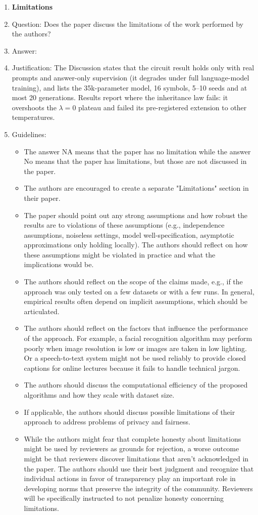 \begin{enumerate}
\item {\bf Limitations}
    \item[] Question: Does the paper discuss the limitations of the work performed by the authors?
    \item[] Answer: \answerYes{}
    \item[] Justification: The Discussion states that the circuit result holds only with real prompts and answer-only supervision (it degrades under full language-model training), and lists the 35k-parameter model, 16 symbols, 5--10 seeds and at most 20 generations. Results report where the inheritance law fails: it overshoots the $\lambda{=}0$ plateau and failed its pre-registered extension to other temperatures.
    \item[] Guidelines:
    \begin{itemize}
        \item The answer NA means that the paper has no limitation while the answer No means that the paper has limitations, but those are not discussed in the paper.
        \item The authors are encouraged to create a separate "Limitations" section in their paper.
        \item The paper should point out any strong assumptions and how robust the results are to violations of these assumptions (e.g., independence assumptions, noiseless settings, model well-specification, asymptotic approximations only holding locally). The authors should reflect on how these assumptions might be violated in practice and what the implications would be.
        \item The authors should reflect on the scope of the claims made, e.g., if the approach was only tested on a few datasets or with a few runs. In general, empirical results often depend on implicit assumptions, which should be articulated.
        \item The authors should reflect on the factors that influence the performance of the approach. For example, a facial recognition algorithm may perform poorly when image resolution is low or images are taken in low lighting. Or a speech-to-text system might not be used reliably to provide closed captions for online lectures because it fails to handle technical jargon.
        \item The authors should discuss the computational efficiency of the proposed algorithms and how they scale with dataset size.
        \item If applicable, the authors should discuss possible limitations of their approach to address problems of privacy and fairness.
        \item While the authors might fear that complete honesty about limitations might be used by reviewers as grounds for rejection, a worse outcome might be that reviewers discover limitations that aren't acknowledged in the paper. The authors should use their best judgment and recognize that individual actions in favor of transparency play an important role in developing norms that preserve the integrity of the community. Reviewers will be specifically instructed to not penalize honesty concerning limitations.
    \end{itemize}


\end{enumerate}

